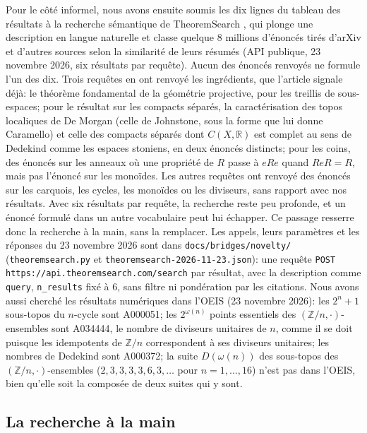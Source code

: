 Pour le côté informel, nous avons ensuite soumis les dix lignes du tableau des résultats à la recherche sémantique de TheoremSearch \cite{theoremsearch}, qui plonge une description en langue naturelle et classe quelque 8 millions d'énoncés tirés d'arXiv et d'autres sources selon la similarité de leurs résumés (API publique, 23 novembre 2026, six résultats par requête). Aucun des énoncés renvoyés ne formule l'un des dix. Trois requêtes en ont renvoyé les ingrédients, que l'article signale déjà: le théorème fondamental de la géométrie projective, pour les treillis de sous-espaces; pour le résultat sur les compacts séparés, la caractérisation des topos localiques de De Morgan (celle de Johnstone, sous la forme que lui donne Caramello) et celle des compacts séparés dont $C(X,\mathbb R)$ est complet au sens de Dedekind comme les espaces stoniens, en deux énoncés distincts; pour les coins, des énoncés sur les anneaux où une propriété de $R$ passe à $eRe$ quand $ReR = R$, mais pas l'énoncé sur les monoïdes. Les autres requêtes ont renvoyé des énoncés sur les carquois, les cycles, les monoïdes ou les diviseurs, sans rapport avec nos résultats. Avec six résultats par requête, la recherche reste peu profonde, et un énoncé formulé dans un autre vocabulaire peut lui échapper. Ce passage resserre donc la recherche à la main, sans la remplacer. Les appels, leurs paramètres et les réponses du 23 novembre 2026 sont dans \texttt{docs/bridges/novelty/} (\texttt{theoremsearch.py} et \texttt{theoremsearch-2026-11-23.json}): une requête \texttt{POST https://api.theoremsearch.com/search} par résultat, avec la description comme \texttt{query}, \texttt{n\_results} fixé à 6, sans filtre ni pondération par les citations. Nous avons aussi cherché les résultats numériques dans l'OEIS \cite{oeis} (23 novembre 2026): les $2^n+1$ sous-topos du $n$-cycle sont A000051; les $2^{\omega(n)}$ points essentiels des $(\mathbb Z/n,\cdot)$-ensembles sont A034444, le nombre de diviseurs unitaires de $n$, comme il se doit puisque les idempotents de $\mathbb Z/n$ correspondent à ses diviseurs unitaires; les nombres de Dedekind sont A000372; la suite $D(\omega(n))$ des sous-topos des $(\mathbb Z/n,\cdot)$-ensembles ($2, 3, 3, 3, 3, 6, 3, \dots$ pour $n=1,\dots,16$) n'est pas dans l'OEIS, bien qu'elle soit la composée de deux suites qui y sont.

\subsection{La recherche à la main}

